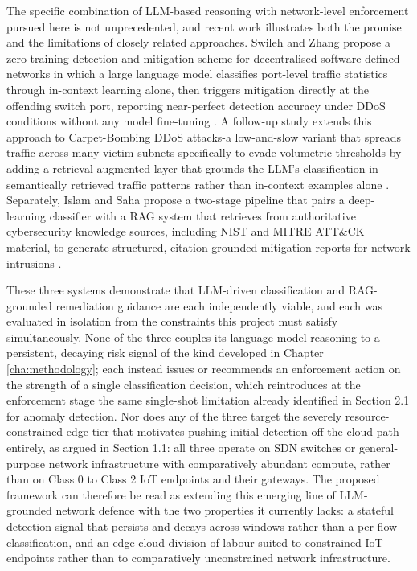 The specific combination of LLM-based reasoning with network-level enforcement pursued here is not unprecedented, and recent work illustrates both the promise and the limitations of closely related approaches. Swileh and Zhang propose a zero-training detection and mitigation scheme for decentralised software-defined networks in which a large language model classifies port-level traffic statistics through in-context learning alone, then triggers mitigation directly at the offending switch port, reporting near-perfect detection accuracy under DDoS conditions without any model fine-tuning \cite{Swileh2025}. A follow-up study extends this approach to Carpet-Bombing DDoS attacks-a low-and-slow variant that spreads traffic across many victim subnets specifically to evade volumetric thresholds-by adding a retrieval-augmented layer that grounds the LLM's classification in semantically retrieved traffic patterns rather than in-context examples alone \cite{Swileh2026}. Separately, Islam and Saha propose a two-stage pipeline that pairs a deep-learning classifier with a RAG system that retrieves from authoritative cybersecurity knowledge sources, including NIST and MITRE ATT\&CK material, to generate structured, citation-grounded mitigation reports for network intrusions \cite{IslamSaha2026}.

These three systems demonstrate that LLM-driven classification and RAG-grounded remediation guidance are each independently viable, and each was evaluated in isolation from the constraints this project must satisfy simultaneously. None of the three couples its language-model reasoning to a persistent, decaying risk signal of the kind developed in Chapter \ref{cha:methodology}; each instead issues or recommends an enforcement action on the strength of a single classification decision, which reintroduces at the enforcement stage the same single-shot limitation already identified in Section 2.1 for anomaly detection. Nor does any of the three target the severely resource-constrained edge tier that motivates pushing initial detection off the cloud path entirely, as argued in Section 1.1: all three operate on SDN switches or general-purpose network infrastructure with comparatively abundant compute, rather than on Class 0 to Class 2 IoT endpoints and their gateways. The proposed framework can therefore be read as extending this emerging line of LLM-grounded network defence with the two properties it currently lacks: a stateful detection signal that persists and decays across windows rather than a per-flow classification, and an edge-cloud division of labour suited to constrained IoT endpoints rather than to comparatively unconstrained network infrastructure.

